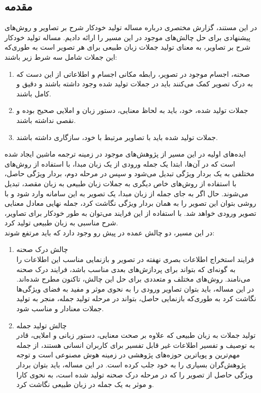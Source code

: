 \subsection{مقدمه}

در این مستند، گزارش مختصری درباره مساله تولید خودکار شرح بر تصاویر و روش‌های پیشنهادی برای حل چالش‌های موجود در این مسیر را ارائه دادیم. مساله تولید خودکار شرح بر تصاویر، به معنای تولید جملات زبان طبیعی برای هر تصویر است به طوری‌که این جملات شامل سه شرط زیر باشند:
\begin{enumerate}
\item صحنه، اجسام موجود در تصویر، رابطه مکانی اجسام و اطلاعاتی از این دست که به درک تصویر کمک می‌کنند باید در جملات تولید شده وجود داشته باشند و دقیق و کامل باشند.
\item جملات تولید شده، خود، باید به لحاظ معنایی، دستور زبان و املایی صحیح بوده و نقصی نداشته باشند.\
\item جملات تولید شده باید با تصاویر مرتبط با خود، سازگاری داشته باشند.
\end{enumerate}

ایده‌های اولیه در این مسیر از پژوهش‌های موجود در زمینه ترجمه ماشین ایجاد شده است که در آن‌ها، ابتدا یک جمله ورودی از یک زبان مبدا، با استفاده از روش‌های مختلفی به یک بردار ویژگی تبدیل می‌شود و سپس در مرحله دوم، بردار ویژگی حاصل، با استفاده از روش‌های خاص دیگری به جملات زبان طبیعی به زبان مقصد، تبدیل می‌شوند. حال اگر به جای جمله از زبان مبدا، یک تصویر به این سامانه وارد شود و با روشی بتوان این تصویر را به همان بردار ویژگی نگاشت کرد، جمله نهایی معادل معنایی تصویر ورودی خواهد شد. با استفاده از این فرایند می‌توان به طور خودکار برای تصاویر، شرح مناسبی به زبان طبیعی تولید کرد.
\\
در این مسیر، دو چالش عمده در پیش رو وجود دارد که باید مرتفع شوند:

\begin{enumerate}
\item چالش درک صحنه
\\
فرایند استخراج اطلاعات بصری نهفته در تصویر و بازنمایی مناسب این اطلاعات را به گونه‌ای که بتواند برای پردازش‌های بعدی مناسب باشد، فرایند درک صحنه می‌نامند. روش‌های مختلف و متعددی برای حل این چالش، تاکنون مطرح شده‌اند. در این مساله‌، باید بتوان تصاویر ورودی را به نحوی موثر و مفید به فضای ویژگی‌ها نگاشت کرد به طوری‌که بازنمایی حاصل، بتواند در مرحله تولید جمله، منجر به تولید جملات معنادار و مناسب شود.
\item چالش تولید جمله
\\
تولید جملات به زبان طبیعی که علاوه بر صحت معنایی، دستور زبانی و املایی، قادر به توصیف و تفسیر اطلاعات غیر قابل تفسیر برای کاربران انسانی هستند، از جمله مهم‌ترین و پویاترین حوزه‌های پژوهشی در زمینه هوش مصنوعی است و توجه پژوهش‌گران بسیاری را به‌ خود جلب کرده است. در این مساله، باید بتوان بردار ویژگی حاصل از تصویر را که در مرحله درک صحنه تولید شده است، به نحوی کارا و موثر به یک جمله در زبان طبیعی نگاشت کرد.
\end{enumerate}


